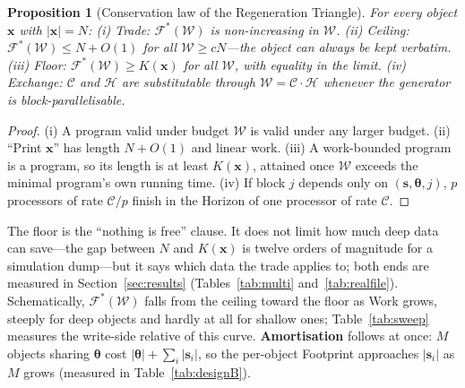 \documentclass[11pt,a4paper]{article}
\theoremstyle{definition}
\theoremstyle{plain}
\newtheorem{proposition}[theorem]{Proposition}
\theoremstyle{remark}
\newcommand{\Foot}{\mathcal{F}}
\newcommand{\Comp}{\mathcal{C}}
\newcommand{\Hori}{\mathcal{H}}
\newcommand{\Work}{\mathcal{W}}
\newcommand{\KC}{K}
\newcommand{\seed}{\mathbf{s}}
\newcommand{\weights}{\bm{\theta}}
\newcommand{\file}{\mathbf{x}}
\begin{document}
\begin{proposition}[Conservation law of the Regeneration Triangle]
\label{thm:law}
For every object $\file$ with $|\file|=N$: (i) \emph{Trade:} $\Foot^{*}(\Work)$ is non-increasing
in $\Work$. (ii) \emph{Ceiling:} $\Foot^{*}(\Work)\le N+O(1)$ for all $\Work\ge cN$---the object
can always be kept verbatim. (iii) \emph{Floor:} $\Foot^{*}(\Work)\ge\KC(\file)$ for all $\Work$,
with equality in the limit. (iv) \emph{Exchange:} $\Comp$ and $\Hori$ are substitutable through
$\Work=\Comp\cdot\Hori$ whenever the generator is block-parallelisable.
\end{proposition}
\begin{proof}
(i) A program valid under budget $\Work$ is valid under any larger budget. (ii) ``Print $\file$''
has length $N+O(1)$ and linear work. (iii) A work-bounded program is a program, so its length is
at least $\KC(\file)$, attained once $\Work$ exceeds the minimal program's own running time.
(iv) If block $j$ depends only on $(\seed,\weights,j)$, $p$ processors of rate $\Comp/p$ finish
in the Horizon of one processor of rate $\Comp$.
\end{proof}

The floor is the ``nothing is free'' clause. It does not limit how much deep data can save---the
gap between $N$ and $\KC(\file)$ is twelve orders of magnitude for a simulation dump---but it
says which data the trade applies to; both ends are measured in Section~\ref{sec:results}
(Tables~\ref{tab:multi} and~\ref{tab:realfile}). Schematically, $\Foot^{*}(\Work)$ falls from the
ceiling toward the floor as Work grows, steeply for deep objects and hardly at all for shallow
ones; Table~\ref{tab:sweep} measures the write-side relative of this curve. \textbf{Amortisation}
follows at once: $M$ objects sharing $\weights$ cost $|\weights|+\sum_i|\seed_i|$, so the
per-object Footprint approaches $|\seed_i|$ as $M$ grows (measured in Table~\ref{tab:designB}).

\end{document}
